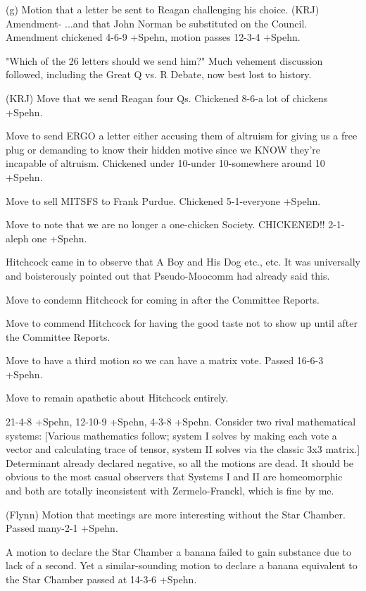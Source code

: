 \documentclass[12pt]{article}
\begin{document}
(g) Motion that a letter be sent to Reagan challenging his choice. (KRJ) Amendment- ...and that John Norman be substituted on the Council. Amendment chickened 4-6-9 +Spehn, motion passes 12-3-4 +Spehn.

"Which of the 26 letters should we send him?" Much vehement discussion followed, including the Great Q vs. R Debate, now best lost to history.

(KRJ) Move that we send Reagan four Qs. Chickened 8-6-a lot of chickens +Spehn.

Move to send ERGO a letter either accusing them of altruism for giving us a free plug or demanding to know their hidden motive since we KNOW they're incapable of altruism. Chickened under 10-under 10-somewhere around 10 +Spehn.

Move to sell MITSFS to Frank Purdue. Chickened 5-1-everyone +Spehn.

Move to note that we are no longer a one-chicken Society. CHICKENED!! 2-1-aleph one +Spehn.

Hitchcock came in to observe that A Boy and His Dog etc., etc. It was universally and boisterously pointed out that Pseudo-Moocomm had already said this.

Move to condemn Hitchcock for coming in after the Committee Reports.

Move to commend Hitchcock for having the good taste not to show up until after the Committee Reports.

Move to have a third motion so we can have a matrix vote. Passed 16-6-3 +Spehn.

Move to remain apathetic about Hitchcock entirely.

21-4-8 +Spehn, 12-10-9 +Spehn, 4-3-8 +Spehn. Consider two rival mathematical systems: [Various mathematics follow; system I solves by making each vote a vector and calculating trace of tensor, system II solves via the classic 3x3 matrix.] Determinant already declared negative, so all the motions are dead. It should be obvious to the most casual observers that Systems I and II are homeomorphic and both are totally inconsistent with Zermelo-Franckl, which is fine by me.

(Flynn) Motion that meetings are more interesting without the Star Chamber. Passed many-2-1 +Spehn.

A motion to declare the Star Chamber a banana failed to gain substance due to lack of a second. Yet a similar-sounding motion to declare a banana equivalent to the Star Chamber passed at 14-3-6 +Spehn.
\end{document}
